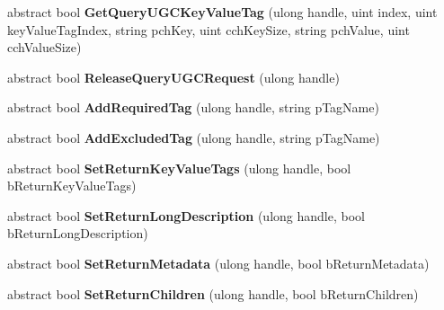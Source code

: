 \begin{DoxyCompactItemize}
\item 
\hypertarget{classValve_1_1Steamworks_1_1ISteamUGC_aff4011958ea5d6bae224188ed1924f75}{}abstract bool {\bfseries Get\+Query\+U\+G\+C\+Key\+Value\+Tag} (ulong handle, uint index, uint key\+Value\+Tag\+Index, string pch\+Key, uint cch\+Key\+Size, string pch\+Value, uint cch\+Value\+Size)\label{classValve_1_1Steamworks_1_1ISteamUGC_aff4011958ea5d6bae224188ed1924f75}

\item 
\hypertarget{classValve_1_1Steamworks_1_1ISteamUGC_aaac1edef3b58b4a7c9ea2f70ab640699}{}abstract bool {\bfseries Release\+Query\+U\+G\+C\+Request} (ulong handle)\label{classValve_1_1Steamworks_1_1ISteamUGC_aaac1edef3b58b4a7c9ea2f70ab640699}

\item 
\hypertarget{classValve_1_1Steamworks_1_1ISteamUGC_afd02491f5e314ac3b99a1326e377f569}{}abstract bool {\bfseries Add\+Required\+Tag} (ulong handle, string p\+Tag\+Name)\label{classValve_1_1Steamworks_1_1ISteamUGC_afd02491f5e314ac3b99a1326e377f569}

\item 
\hypertarget{classValve_1_1Steamworks_1_1ISteamUGC_acd075382a6786ae99d2c9e5aec72a5f0}{}abstract bool {\bfseries Add\+Excluded\+Tag} (ulong handle, string p\+Tag\+Name)\label{classValve_1_1Steamworks_1_1ISteamUGC_acd075382a6786ae99d2c9e5aec72a5f0}

\item 
\hypertarget{classValve_1_1Steamworks_1_1ISteamUGC_aeaf5498705eae39845d5c3553d283930}{}abstract bool {\bfseries Set\+Return\+Key\+Value\+Tags} (ulong handle, bool b\+Return\+Key\+Value\+Tags)\label{classValve_1_1Steamworks_1_1ISteamUGC_aeaf5498705eae39845d5c3553d283930}

\item 
\hypertarget{classValve_1_1Steamworks_1_1ISteamUGC_ab8f148d1663f1ecfae61c157b1b901ba}{}abstract bool {\bfseries Set\+Return\+Long\+Description} (ulong handle, bool b\+Return\+Long\+Description)\label{classValve_1_1Steamworks_1_1ISteamUGC_ab8f148d1663f1ecfae61c157b1b901ba}

\item 
\hypertarget{classValve_1_1Steamworks_1_1ISteamUGC_ac17c1fdd4b06e7afdcd7523a7c8ef261}{}abstract bool {\bfseries Set\+Return\+Metadata} (ulong handle, bool b\+Return\+Metadata)\label{classValve_1_1Steamworks_1_1ISteamUGC_ac17c1fdd4b06e7afdcd7523a7c8ef261}

\item 
\hypertarget{classValve_1_1Steamworks_1_1ISteamUGC_a4736772106a0e8b088a9fc139b7a53c9}{}abstract bool {\bfseries Set\+Return\+Children} (ulong handle, bool b\+Return\+Children)\label{classValve_1_1Steamworks_1_1ISteamUGC_a4736772106a0e8b088a9fc139b7a53c9}


\end{DoxyCompactItemize}
